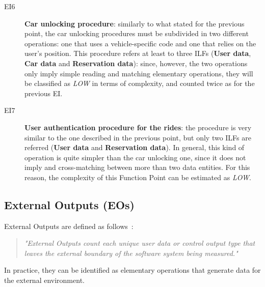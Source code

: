 \begin{description}
\item[EI6] \textbf{Car unlocking procedure}: similarly to what stated for the previous point, the car unlocking procedures must be subdivided in two different operations: one that uses a vehicle-specific code and one that relies on the user's position. This procedure refers at least to three ILFs (\textbf{User data}, \textbf{Car data} and \textbf{Reservation data}): since, however, the two operations only imply simple reading and matching elementary operations, they will be classified as \textit{LOW} in terms of complexity, and counted twice as for the previous EI.
\item[EI7] \textbf{User authentication procedure for the rides}: the procedure is very similar to the one described in the previous point, but only two ILFs are referred (\textbf{User data} and \textbf{Reservation data}). In general, this kind of operation is quite simpler than the car unlocking one, since it does not imply and cross-matching between more than two data entities. For this reason, the complexity of this Function Point can be estimated as \textit{LOW}.
\end{description}

\subsection{External Outputs (EOs)}
External Outputs are defined as follows~\cite{cocomo-manual}:
\begin{quotation}
\textit{"External Outputs count each unique user data or control output type that leaves the external boundary of the software system being measured."}
\end{quotation}
In practice, they can be identified as elementary operations that generate data for the external environment.

